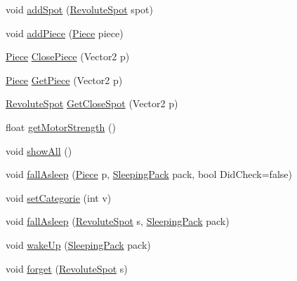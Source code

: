 \begin{DoxyCompactItemize}
\item 
void \hyperlink{classgearit_1_1src_1_1robot_1_1_robot_aca31f79167658df4e1c00201e652d13e}{add\+Spot} (\hyperlink{classgearit_1_1src_1_1robot_1_1_revolute_spot}{Revolute\+Spot} spot)
\item 
void \hyperlink{classgearit_1_1src_1_1robot_1_1_robot_a02cb3e784efbed703e41c842ae65c9a9}{add\+Piece} (\hyperlink{classgearit_1_1src_1_1robot_1_1_piece}{Piece} piece)
\item 
\hyperlink{classgearit_1_1src_1_1robot_1_1_piece}{Piece} \hyperlink{classgearit_1_1src_1_1robot_1_1_robot_adb7009fa5776025621e69d85df63dfa7}{Close\+Piece} (Vector2 p)
\item 
\hyperlink{classgearit_1_1src_1_1robot_1_1_piece}{Piece} \hyperlink{classgearit_1_1src_1_1robot_1_1_robot_a52d61f4419b94d1aec0b0838fee09415}{Get\+Piece} (Vector2 p)
\item 
\hyperlink{classgearit_1_1src_1_1robot_1_1_revolute_spot}{Revolute\+Spot} \hyperlink{classgearit_1_1src_1_1robot_1_1_robot_aa347b18c64184d66e2d32ff4f844444c}{Get\+Close\+Spot} (Vector2 p)
\item 
float \hyperlink{classgearit_1_1src_1_1robot_1_1_robot_a6f53b80c92946021a6c167aba200492c}{get\+Motor\+Strength} ()
\item 
void \hyperlink{classgearit_1_1src_1_1robot_1_1_robot_a490e71c6f9c18403b013901844760d0e}{show\+All} ()
\item 
void \hyperlink{classgearit_1_1src_1_1robot_1_1_robot_a20cb38081d33e2c1e69f8229a6b721ea}{fall\+Asleep} (\hyperlink{classgearit_1_1src_1_1robot_1_1_piece}{Piece} p, \hyperlink{classgearit_1_1src_1_1robot_1_1_sleeping_pack}{Sleeping\+Pack} pack, bool Did\+Check=false)
\item 
void \hyperlink{classgearit_1_1src_1_1robot_1_1_robot_af2f16c1240b6009d37b555bd9269b308}{set\+Categorie} (int v)
\item 
void \hyperlink{classgearit_1_1src_1_1robot_1_1_robot_a54ca096aa1e0a7228ce26b77f17cd133}{fall\+Asleep} (\hyperlink{classgearit_1_1src_1_1robot_1_1_revolute_spot}{Revolute\+Spot} s, \hyperlink{classgearit_1_1src_1_1robot_1_1_sleeping_pack}{Sleeping\+Pack} pack)
\item 
void \hyperlink{classgearit_1_1src_1_1robot_1_1_robot_a450b1c0a50d17e1593b7b06b83b1bd10}{wake\+Up} (\hyperlink{classgearit_1_1src_1_1robot_1_1_sleeping_pack}{Sleeping\+Pack} pack)
\item 
void \hyperlink{classgearit_1_1src_1_1robot_1_1_robot_a60ea55dc2a7344abde409f0295e8ba91}{forget} (\hyperlink{classgearit_1_1src_1_1robot_1_1_revolute_spot}{Revolute\+Spot} s)

\end{DoxyCompactItemize}
